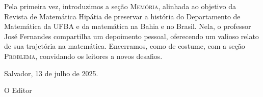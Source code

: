 \documentclass[onecolumn]{hipatia}
\begin{document}
Pela primeira vez, introduzimos a seção 
\textsc{Memória}, alinhada ao objetivo da 
Revista de Matemática Hipátia de preservar 
a história do Departamento de Matemática 
da UFBA e da matemática na Bahia e no Brasil. 
Nela, o professor José Fernandes compartilha 
um depoimento pessoal, oferecendo um valioso 
relato de sua trajetória na matemática. 
Encerramos, como de costume, com a seção \textsc{Problema}, 
convidando os leitores a novos desafios.



\vspace{1cm}

\hfill Salvador, 13 de julho de 2025.

\hfill O Editor
\end{document}
